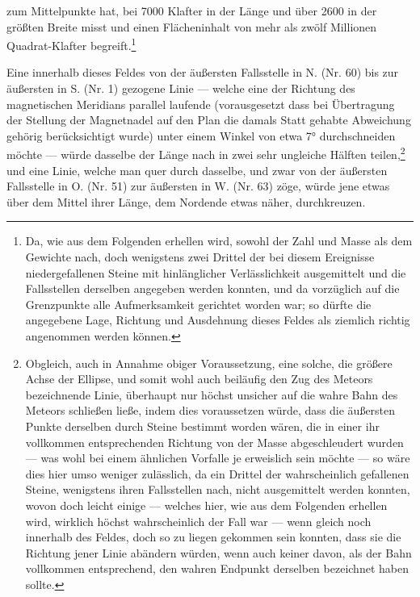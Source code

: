 \documentclass[a4paper, 11pt, oneside, german]{article}
\begin{document}
zum Mittelpunkte hat, bei 7000 Klafter in der Länge und über 2600 in der größten Breite misst und einen Flächeninhalt von mehr als zwölf Millionen Quadrat-Klafter begreift.\footnote{Da, wie aus dem Folgenden erhellen wird, sowohl der Zahl und Masse als dem Gewichte nach, doch wenigstens zwei Drittel der bei diesem Ereignisse niedergefallenen Steine mit hinlänglicher Verlässlichkeit ausgemittelt und die Fallsstellen derselben angegeben werden konnten, und da vorzüglich auf die Grenzpunkte alle Aufmerksamkeit gerichtet worden war; so dürfte die angegebene Lage, Richtung und Ausdehnung dieses Feldes als ziemlich richtig angenommen werden können.}

Eine innerhalb dieses Feldes von der äußersten Fallsstelle in N. (Nr. 60) bis zur äußersten in S. (Nr. 1) gezogene Linie --- welche eine der Richtung des magnetischen Meridians parallel laufende (vorausgesetzt dass bei Übertragung der Stellung der Magnetnadel auf den Plan die damals Statt gehabte Abweichung gehörig berücksichtigt wurde) unter einem Winkel von etwa 7° durchschneiden möchte --- würde dasselbe der Länge nach in zwei sehr ungleiche Hälften teilen,\footnote{Obgleich, auch in Annahme obiger Voraussetzung, eine solche, die größere Achse der Ellipse, und somit wohl auch beiläufig den Zug des Meteors bezeichnende Linie, überhaupt nur höchst unsicher auf die wahre Bahn des Meteors schließen ließe, indem dies voraussetzen würde, dass die äußersten Punkte derselben durch Steine bestimmt worden wären, die in einer ihr vollkommen entsprechenden Richtung von der Masse abgeschleudert wurden --- was wohl bei einem ähnlichen Vorfalle je erweislich sein möchte --- so wäre dies hier umso weniger zulässlich, da ein Drittel der wahrscheinlich gefallenen Steine, wenigstens ihren Fallsstellen nach, nicht ausgemittelt werden konnten, wovon doch leicht einige --- welches hier, wie aus dem Folgenden erhellen wird, wirklich höchst wahrscheinlich der Fall war --- wenn gleich noch innerhalb des Feldes, doch so zu liegen gekommen sein konnten, dass sie die Richtung jener Linie abändern würden, wenn auch keiner davon, als der Bahn vollkommen entsprechend, den wahren Endpunkt derselben bezeichnet haben sollte.} und eine Linie, welche man quer durch dasselbe, und zwar von der äußersten Fallsstelle in O. (Nr. 51) zur äußersten in W. (Nr. 63) zöge, würde jene etwas über dem Mittel ihrer Länge, dem Nordende etwas näher, durchkreuzen.
\end{document}
